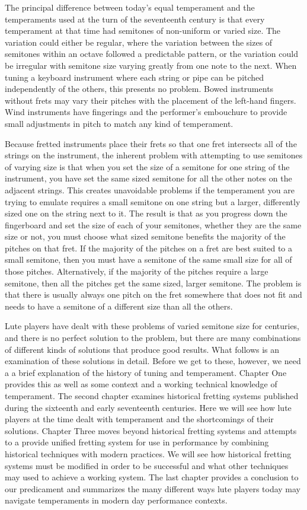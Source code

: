 The principal difference between today's equal temperament and the temperaments used at
the turn of the seventeenth century is that every temperament at that time had
semitones of non-uniform or varied size.  The variation could either be regular, where
the variation between the sizes of semitones within an octave followed a predictable
pattern, or the variation could be irregular with semitone size varying greatly from
one note to the next. When tuning a keyboard instrument where each string or pipe can
be pitched independently of the others, this presents no problem.  Bowed instruments
without frets may vary their pitches with the placement of the left-hand fingers.  Wind
instruments have fingerings and the performer's embouchure to provide small adjustments
in pitch to match any kind of temperament.

Because fretted instruments place their frets so that one fret intersects all of the
strings on the instrument, the inherent problem with attempting to use semitones of
varying size is that when you set the size of a semitone for one string of the
instrument, you have set the same sized semitone for all the other notes on the
adjacent strings. This creates unavoidable problems if the temperament you are trying
to emulate requires a small semitone on one string but a larger, differently sized one
on the string next to it. The result is that as you progress down the fingerboard and
set the size of each of your semitones, whether they are the same size or not, you must
choose what sized semitone benefits the majority of the pitches on that fret. If the
majority of the pitches on a fret are best suited to a small semitone, then you must
have a semitone of the same small size for all of those pitches. Alternatively, if the
majority of the pitches require a large semitone, then all the pitches get the same
sized, larger semitone.  The problem is that there is usually always one pitch on the
fret somewhere that does not fit and needs to have a semitone of a different size than
all the others.

Lute players have dealt with these problems of varied semitone size for centuries, and
there is no perfect solution to the problem, but there are many combinations of
different kinds of solutions that produce good results. What follows is an examination
of these solutions in detail.  Before we get to these, however, we need a a brief
explanation of the history of tuning and temperament. Chapter One provides this as well
as some context and a working technical knowledge of temperament. The second chapter
examines historical fretting systems published during the sixteenth and early
seventeenth centuries. Here we will see how lute players at the time dealt with
temperament and the shortcomings of their solutions. Chapter Three moves beyond
historical fretting systems and attempts to a provide unified fretting system for use
in performance by combining historical techniques with modern practices.  We will see
how historical fretting systems must be modified in order to be successful and what
other techniques may used to achieve a working system. The last chapter provides a
conclusion to our predicament and summarizes the many different ways lute players today
may navigate temperaments in modern day performance contexts.

